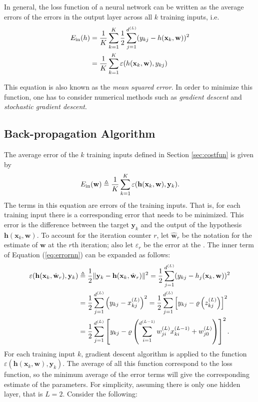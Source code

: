 In general, the loss function of a neural network can be written as the average errors of the errors in the output layer across all $k$ training inputs, i.e.
\begin{align}
E_{\mathrm{in}}(h)&=\frac{1}{K}\sum_{k=1}^K\frac{1}{2}\sum_{j=1}^{d^{(L)}}(y_{kj}-h(\mathbf{x}_{k},\mathbf{w}))^2\\
&=\frac{1}{K}\sum_{k=1}^K\varepsilon(h(\mathbf{x}_{k},\mathbf{w}),y_{kj})
\end{align}

This equation is also known as the \textit{mean squared error}. In order to minimize this function, one has to consider numerical methods such as \textit{gradient descent} and \textit{stochastic gradient descent}.
\subsection{Back-propagation Algorithm}\label{sec:backprop}
The average error of the $k$ training inputs defined in Section \ref{sec:costfun} is given by
\begin{equation}\label{eq:errornn}
E_{\mathrm{in}}(\mathbf{w})\triangleq\frac{1}{K}\sum_{k=1}^{K}\varepsilon(\mathbf{h}(\mathbf{x}_k,\mathbf{w}),\mathbf{y}_k).
\end{equation}
The terms in this equation are errors of the training inputs. That is, for each training input there is a corresponding error that needs to be minimized. This error is the difference between the target $\mathbf{y}_k$ and the output of the hypothesis $\mathbf{h}(\mathbf{x}_k,\mathbf{w})$. To account for the iteration counter $r$, let $\hat{\mathbf{w}}_r$ be the notation for the estimate of $\mathbf{w}$ at the $r$th iteration; also let $\varepsilon_r$ be the error at the . The inner term of Equation (\ref{eq:errornn}) can be expanded as follows:
\begin{align}
\varepsilon(\mathbf{h}(\mathbf{x}_k,\hat{\mathbf{w}}_r),\mathbf{y}_k)&\triangleq\frac{1}{2}\lVert\mathbf{y}_k-\mathbf{h}(\mathbf{x}_k,\hat{\mathbf{w}}_r)\rVert^2=\frac{1}{2}\sum_{j=1}^{d^{(L)}}(y_{kj}-h_j(\mathbf{x}_k,\mathbf{w}))^2\nonumber\\
&=\frac{1}{2}\sum_{j=1}^{d^{(L)}}\left(y_{kj}-x_{kj}^{(L)}\right)^2=\frac{1}{2}\sum_{j=1}^{d^{(L)}}\left[y_{kj}-\varrho\left(z_{kj}^{(L)}\right)\right]^2\nonumber\\
&=\frac{1}{2}\sum_{j=1}^{d^{(L)}}\left[y_{kj}-\varrho\left(\sum_{i=1}^{d^{(L-1)}}w_{ji}^{(L)}x_{ki}^{(L-1)}+w_{j0}^{(L)}\right)\right]^2.
\end{align}
For each training input $k$, gradient descent algorithm is applied to the function $\varepsilon(\mathbf{h}(\mathbf{x}_k,\mathbf{w}),\mathbf{y}_{k})$. The average of all this function correspond to the loss function, so the minimum average of the error terms will give the corresponding estimate of the parameters. For simplicity, assuming there is only one hidden layer, that is $L=2$. Consider the following:
